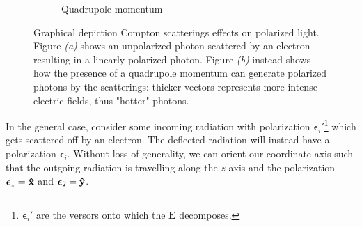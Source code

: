 \begin{figure}[h]
\begin{subfigure}[b]{0.45\textwidth}
    \caption{Quadrupole momentum}
    \end{subfigure}
    \caption{Graphical depiction Compton scatterings effects on polarized light. Figure \emph{(a)} shows an unpolarized photon scattered by an electron resulting in a linearly polarized photon. Figure \emph{(b)} instead shows how the presence of a quadrupole momentum can generate polarized photons by the scatterings: thicker vectors represents more intense electric fields, thus "hotter" photons.}
    \label{fig:compton_polarization}
\end{figure}
In the general case, consider some incoming radiation with polarization $\boldsymbol{\epsilon}_i'$\footnote{$\boldsymbol{\epsilon}_i'$ are the versors onto which the $\mathbf{E}$ decomposes.} which gets scattered off by an electron. The deflected radiation will instead have a polarization $\boldsymbol{\epsilon}_i$. Without loss of generality, we can orient our coordinate axis such that the outgoing radiation is travelling along the $z$ axis and the polarization $\boldsymbol{\epsilon}_1=\mathbf{\hat{x}}$ and $\boldsymbol{\epsilon}_2=\mathbf{\hat{y}}$.\\
